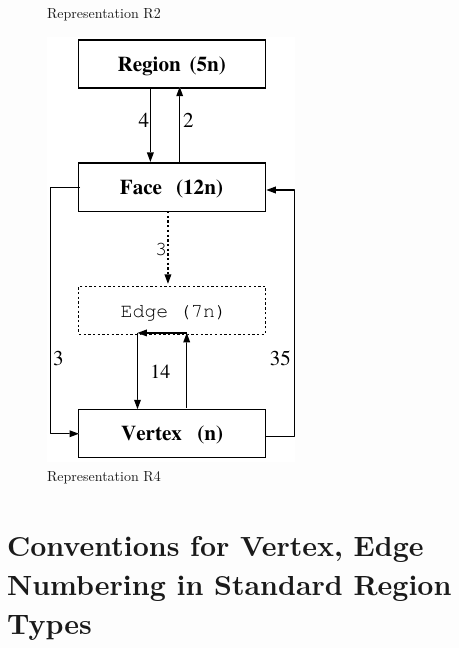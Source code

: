\documentclass[12pt]{article}
\begin{document}
\begin{figure}[!ht]
\begin{center}
\begin{minipage}{1.75in}
\begin{center}
        Representation R2
      \end{center}
    \end{minipage}
    \begin{minipage}{1.75in}
      \begin{center}
        \includegraphics[scale=0.9]{figures/repR4} \\
        Representation R4
      \end{center}
    \end{minipage}
  \end{center}
\end{figure}

\newpage
\section{Conventions for Vertex, Edge Numbering in Standard Region Types}
\label{app:reg_conventions}
\end{document}
